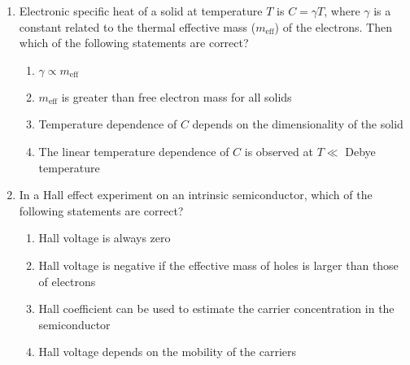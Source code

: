 \documentclass[journal,12pt,onecolumn]{IEEEtran}
\theoremstyle{remark}
\begin{document}
\begin{enumerate}
    \item Electronic specific heat of a solid at temperature $ T $ is $ C = \gamma T $, where $ \gamma $ is a constant related to the thermal effective mass ($ m_{\text{eff}} $) of the electrons. Then which of the following statements are correct?
    \begin{enumerate}
        \item $ \gamma \propto m_{\text{eff}} $
        \item $ m_{\text{eff}} $ is greater than free electron mass for all solids
        \item Temperature dependence of $ C $ depends on the dimensionality of the solid
        \item The linear temperature dependence of $ C $ is observed at $ T \ll $ Debye temperature
    \end{enumerate}
    \item In a Hall effect experiment on an intrinsic semiconductor, which of the following statements are correct?
    \begin{enumerate}
        \item Hall voltage is always zero
        \item Hall voltage is negative if the effective mass of holes is larger than those of electrons
        \item Hall coefficient can be used to estimate the carrier concentration in the semiconductor
        \item Hall voltage depends on the mobility of the carriers
    \end{enumerate}

\end{enumerate}
\end{document}

